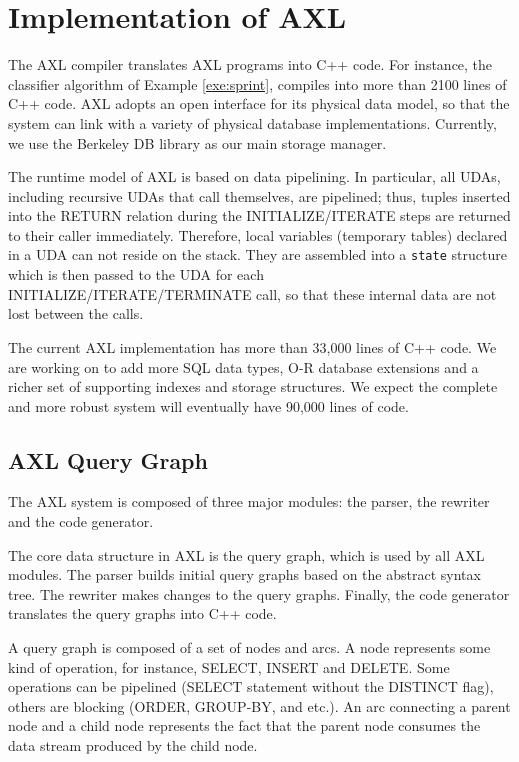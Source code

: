 \chapter{Implementation of AXL\label{chap:imp}}

The AXL compiler translates AXL programs into C++ code. For instance,
the classifier algorithm of Example \ref{exe:sprint}, compiles into
more than 2100 lines of C++ code. AXL adopts an open interface for its
physical data model, so that the system can link with a variety of
physical database implementations.  Currently, we use the Berkeley DB
library\cite{berkeley} as our main storage manager.


The runtime model of AXL is based on data pipelining. In particular,
all UDAs, including recursive UDAs that call themselves, are
pipelined; thus, tuples inserted into the RETURN relation during the
INITIALIZE/ITERATE steps are returned to their caller immediately.
Therefore, local variables (temporary tables) declared in a UDA can
not reside on the stack. They are assembled into a {\tt state}
structure which is then passed to the UDA for each
INITIALIZE/ITERATE/TERMINATE call, so that these internal data are not
lost between the calls.

The current AXL implementation has more than 33,000 lines of C++ code.
We are working on to add more SQL data types, O-R database extensions
and a richer set of supporting indexes and storage structures. We
expect the complete and more robust system will eventually have 90,000
lines of code.


\section{AXL Query Graph}
The AXL system is composed of three major modules: the parser, the
rewriter and the code generator.

The core data structure in AXL is the query graph, which is used by
all AXL modules. The parser builds initial query graphs based on the
abstract syntax tree. The rewriter makes changes to the query graphs.
Finally, the code generator translates the query graphs into C++ code.

A query graph is composed of a set of nodes and arcs. A node
represents some kind of operation, for instance, SELECT, INSERT and
DELETE. Some operations can be pipelined (SELECT statement without the
DISTINCT flag), others are blocking (ORDER, GROUP-BY, and etc.). An
arc connecting a parent node and a child node represents the fact that
the parent node consumes the data stream produced by the child node.

